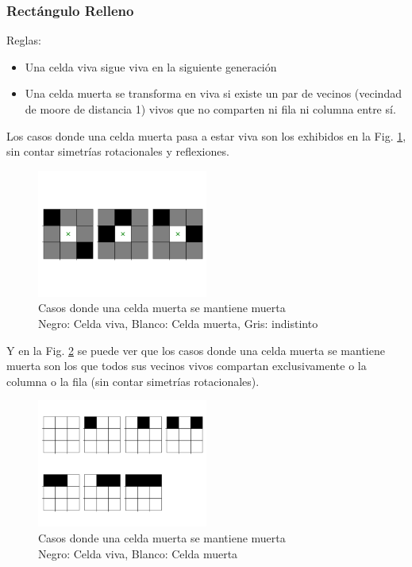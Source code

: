 \subsubsection{Rectángulo Relleno}
Reglas:
\begin{itemize}
    \item Una celda viva sigue viva en la siguiente generación
    \item Una celda muerta se transforma en viva si existe un par de vecinos (vecindad de moore de distancia 1) vivos que no comparten ni fila ni columna entre sí.
\end{itemize}
Los casos donde una celda muerta pasa a estar viva son los exhibidos en la Fig. \ref{fig:filllive}, sin contar simetrías rotacionales y reflexiones.
\begin{figure}[H]
    \centering
    \includegraphics[width=0.5\textwidth]{Images/fill_example_1b}
    \captionsetup{justification=centering}
    \caption{Casos donde una celda muerta se mantiene muerta \\ Negro: Celda viva, Blanco: Celda muerta, Gris: indistinto}
    \label{fig:filllive}
\end{figure}

Y en la Fig. \ref{fig:filldead} se puede ver que los casos donde una celda muerta se mantiene muerta son los que todos sus vecinos vivos compartan exclusivamente o la columna o la fila (sin contar simetrías rotacionales).
\begin{figure}[H]
    \centering
    \includegraphics[width=0.5\textwidth]{Images/fill_example_1a}
    \captionsetup{justification=centering}
    \caption{Casos donde una celda muerta se mantiene muerta\\ Negro: Celda viva, Blanco: Celda muerta}
    \label{fig:filldead}
\end{figure}


